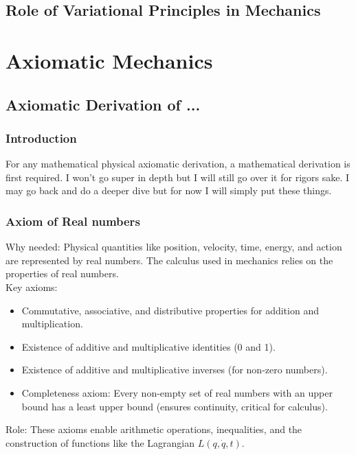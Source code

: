 \subsection{Role of Variational Principles in Mechanics}
\section{Axiomatic Mechanics}
\subsection{Axiomatic Derivation of ... }
\subsubsection{Introduction}
\par For any mathematical physical axiomatic derivation, a mathematical derivation is first required. I won't go super in depth but I will still go over it for rigors sake. I may go back and do a deeper dive but for now I will simply put these things.
\subsubsection{Axiom of Real numbers}
Why needed: Physical quantities like position, velocity, time, energy, and action are represented by real numbers. The calculus used in mechanics relies on the properties of real numbers.
\\
Key axioms:
\begin{itemize}
    \item Commutative, associative, and distributive properties for addition and multiplication.\
    \item Existence of additive and multiplicative identities (0 and 1).
    \item Existence of additive and multiplicative inverses (for non-zero numbers).
    \item Completeness axiom: Every non-empty set of real numbers with an upper bound has a least upper bound (ensures continuity, critical for calculus).
\end{itemize}



Role: These axioms enable arithmetic operations, inequalities, and the construction of functions like the Lagrangian $ L(q, \dot{q}, t) $.

